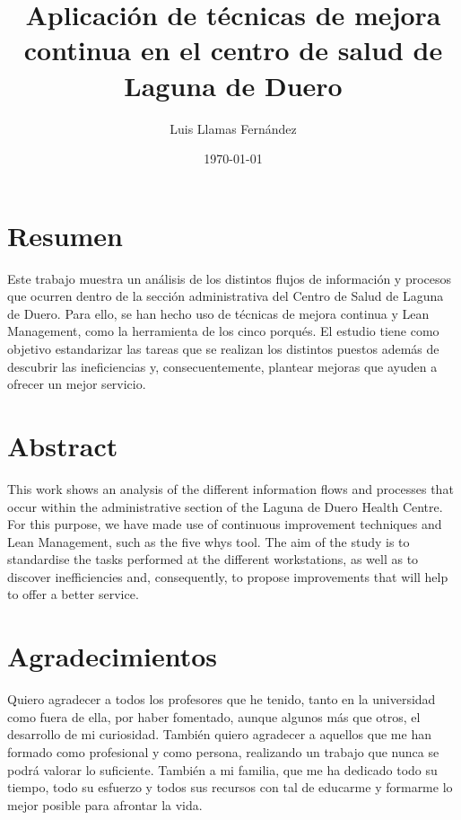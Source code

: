 \documentclass[12pt, a4paper, twoside, openright]{report}
\begin{document}
\title{Aplicación de técnicas de mejora continua en el centro de salud de Laguna de Duero}
\author{Luis Llamas Fernández}
\date{\today}
\maketitle

\thispagestyle{empty}

\chapter*{Resumen}
Este trabajo muestra un análisis de los distintos flujos de información y procesos que ocurren dentro de la sección 
administrativa del Centro de Salud de Laguna de Duero.
Para ello, se han hecho uso de técnicas de mejora continua y Lean 
Management, como la herramienta de los cinco porqués.
El estudio tiene como objetivo estandarizar las tareas que se realizan 
los distintos puestos además de descubrir las ineficiencias y, consecuentemente, plantear mejoras que ayuden a ofrecer un 
mejor servicio.

\setcounter{page}{1}

\chapter*{Abstract}
This work shows an analysis of the different information flows and processes that occur within the administrative section of the Laguna de Duero Health Centre.
For this purpose, we have made use of continuous improvement techniques and Lean  Management, such as the five whys tool.
The aim of the study is to standardise the tasks performed at the different workstations, as well as to discover inefficiencies and, consequently, to propose improvements that will help to offer a better service.

\chapter*{Agradecimientos}
Quiero agradecer a todos los profesores que he tenido, tanto en la universidad como fuera de ella, por haber fomentado, aunque algunos más que otros, el desarrollo de mi curiosidad. También quiero agradecer a aquellos que me han formado como profesional y como persona, realizando un trabajo que nunca se podrá valorar lo suficiente. También a mi familia, que me ha dedicado todo su tiempo, todo su esfuerzo y todos sus recursos con tal de educarme y formarme lo mejor posible para afrontar la vida.
\end{document}
